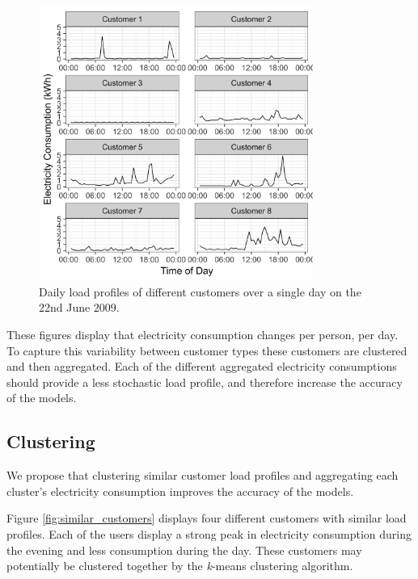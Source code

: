 \begin{figure}
	\includegraphics[width=0.8\textwidth]{Chapter5/figures/Rplot02.png}
	\caption{Daily load profiles of different customers over a single day on the 22nd June 2009.}
	\label{fig:multiple_users}
\end{figure}

These figures display that electricity consumption changes per person, per day. To capture this variability between customer types these customers are clustered and then aggregated. Each of the different aggregated electricity consumptions should provide a less stochastic load profile, and therefore increase the accuracy of the models.

\subsection{Clustering}

We propose that clustering similar customer load profiles and aggregating each cluster's electricity consumption improves the accuracy of the models. 

Figure \ref{fig:similar_customers} displays four different customers with similar load profiles. Each of the users display a strong peak in electricity consumption during the evening and less consumption during the day. These customers may potentially be clustered together by the \textit{k}-means clustering algorithm.

